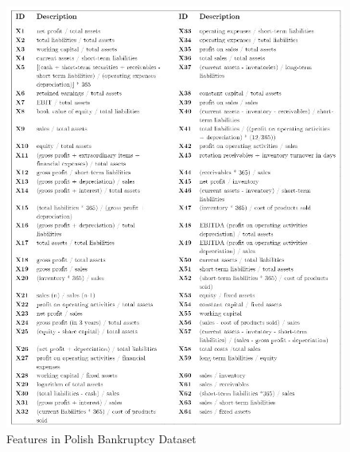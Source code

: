 \begin{figure}[ht]
\centering
  \includegraphics[scale = .72]{imgs/features.JPG}
  \caption{Features in Polish Bankruptcy Dataset \cite{saisree:github}}
  \label{fig:features}
\end{figure}



